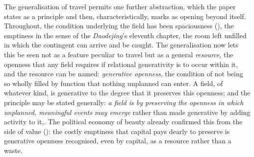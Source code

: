 The generalisation of travel permits one further abstraction, which the paper states as a principle and then, characteristically, marks as opening beyond itself. Throughout, the condition underlying the field has been spaciousness (), the emptiness in the sense of the \emph{Daodejing}'s eleventh chapter, the room left unfilled in which the contingent can arrive and be caught. The generalisation now lets this be seen not as a feature peculiar to travel but as a general \emph{resource}, the openness that any field requires if relational generativity is to occur within it, and the resource can be named: \emph{generative openness}, the condition of not being so wholly filled by function that nothing unplanned can enter. A field, of whatever kind, is generative to the degree that it preserves this openness; and the principle may be stated generally: \emph{a field is by preserving the openness in which unplanned, meaningful events may emerge} rather than made generative by adding activity to it,. The political economy of beauty already confirmed this from the side of value (): the costly emptiness that capital pays dearly to preserve is generative openness recognised, even by capital, as a resource rather than a waste.

